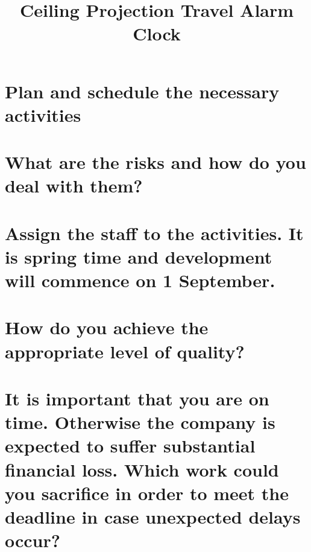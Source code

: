\documentclass[10pt, a4]{article}
\title{Ceiling Projection Travel Alarm Clock} %
\begin{document}
\maketitle

\label{cha:Ceiling}

\section{Plan and schedule the necessary activities} 



\section{What are the risks and how do you deal with them?}
\section{Assign the staff to the activities. It is spring time and development will commence on
1 September.}
\section{How do you achieve the appropriate level of quality?}
\section{It is important that you are on time. Otherwise the company is expected to suffer substantial financial loss. Which work could you sacrifice in order to meet the deadline in case unexpected delays occur?}
\end{document}
